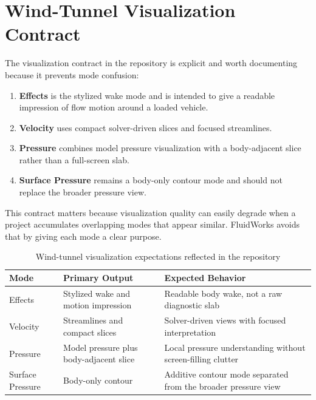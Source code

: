\documentclass[12pt,a4paper,titlepage]{report}
\begin{document}
\section{Wind-Tunnel Visualization Contract}
The visualization contract in the repository is explicit and worth documenting because it prevents mode confusion:
\begin{enumerate}
\item \textbf{Effects} is the stylized wake mode and is intended to give a readable impression of flow motion around a loaded vehicle.
\item \textbf{Velocity} uses compact solver-driven slices and focused streamlines.
\item \textbf{Pressure} combines model pressure visualization with a body-adjacent slice rather than a full-screen slab.
\item \textbf{Surface Pressure} remains a body-only contour mode and should not replace the broader pressure view.
\end{enumerate}

This contract matters because visualization quality can easily degrade when a project accumulates overlapping modes that appear similar. FluidWorks avoids that by giving each mode a clear purpose.

\begin{table}[H]
\centering
\caption{Wind-tunnel visualization expectations reflected in the repository}
\label{tab:windmodes}
\begin{tabular}{p{2.8cm}p{3.6cm}p{6.4cm}}
\toprule
\textbf{Mode} & \textbf{Primary Output} & \textbf{Expected Behavior} \\
\midrule
Effects & Stylized wake and motion impression & Readable body wake, not a raw diagnostic slab \\
Velocity & Streamlines and compact slices & Solver-driven views with focused interpretation \\
Pressure & Model pressure plus body-adjacent slice & Local pressure understanding without screen-filling clutter \\
Surface Pressure & Body-only contour & Additive contour mode separated from the broader pressure view \\
\bottomrule
\end{tabular}
\end{table}
\end{document}
